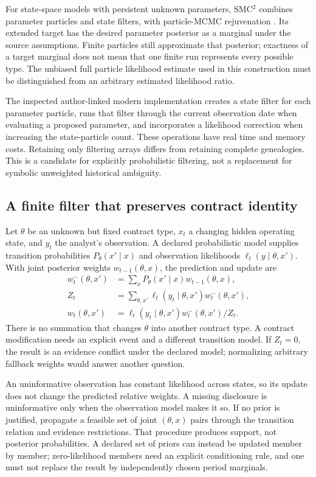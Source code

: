 \documentclass[11pt,a4paper]{article}
\begin{document}
For state-space models with persistent unknown parameters, SMC$^2$ combines
parameter particles and state filters, with particle-MCMC rejuvenation
\cite[Section~3.2, equation~(7), Proposition~1, Appendix~A]{smc2}. Its
extended target has the desired parameter posterior as a marginal under the
source assumptions. Finite particles still approximate that posterior; exactness
of a target marginal does not mean that one finite run represents every
possible type. The unbiased full particle likelihood estimate used in this
construction must be distinguished from an arbitrary estimated likelihood
ratio.

The inspected author-linked modern implementation creates a state filter for
each parameter particle, runs that filter through the current observation date
when evaluating a proposed parameter, and incorporates a likelihood correction
when increasing the state-particle count. These operations have real time and
memory costs. Retaining only filtering arrays differs from retaining complete
genealogies. This is a candidate for explicitly probabilistic filtering, not
a replacement for symbolic unweighted historical ambiguity.


\subsection{A finite filter that preserves contract identity}
Let $\theta$ be an unknown but fixed contract type, $x_t$ a changing hidden
operating state, and $y_t$ the analyst's observation. A declared probabilistic
model supplies transition probabilities $P_\theta(x'\mid x)$ and observation
likelihoods $\ell_t(y\mid\theta,x')$. With joint posterior weights
$w_{t-1}(\theta,x)$, the prediction and update are
\begin{align}
w_t^-(\theta,x')&=\sum_x
  P_\theta(x'\mid x)w_{t-1}(\theta,x),\\
Z_t&=\sum_{\theta,x'}\ell_t(y_t\mid\theta,x')w_t^-(\theta,x'),\\
w_t(\theta,x')&=\ell_t(y_t\mid\theta,x')w_t^-(\theta,x')/Z_t.
\end{align}
There is no summation that changes $\theta$ into another contract type. A
contract modification needs an explicit event and a different transition
model. If $Z_t=0$, the result is an evidence conflict under the declared model;
normalizing arbitrary fallback weights would answer another question.

An uninformative observation has constant likelihood across states, so its
update does not change the predicted relative weights. A missing disclosure
is uninformative only when the observation model makes it so. If no prior is
justified, propagate a feasible set of joint $(\theta,x)$ pairs through the
transition relation and evidence restrictions. That procedure produces support,
not posterior probabilities. A declared set of priors can instead be updated
member by member; zero-likelihood members need an explicit conditioning rule,
and one must not replace the result by independently chosen period marginals.
\end{document}
